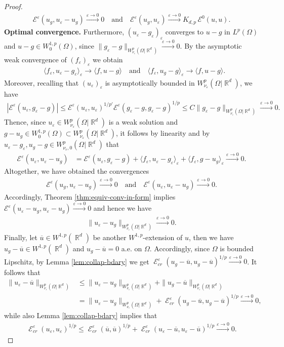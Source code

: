 \documentclass[12pt, reqno]{amsart}%
\theoremstyle{plain}  %
\theoremstyle{definition}  %
\numberwithin{equation}{section}
\DeclareMathOperator{\cE}{\mathcal{E}}
\DeclareMathOperator{\R}{\mathbb{R}}
\newcommand{\eps}{\varepsilon}
\newcommand{\WnuOmRa}{W^p_{\nu_\eps}(\Omega|\R^d )}
\begin{document}
\begin{proof}
\begin{align*}
\mathcal{E}^\eps(u_g,u_\eps-u_g) \xrightarrow{\eps\to0}0
\quad\text{and}\quad
\mathcal{E}^\eps(u_g,u_\eps)
\xrightarrow{\eps\to0}
K_{d,p}\,\mathcal{E}^0(u,u).
\end{align*}
\textbf{Optimal convergence.} Furthermore, $(u_\eps-g_\eps)_\eps$ converges to $u-g$ in $L^p(\Omega)$ and $u-g\in W^{1,p}_0(\Omega)$, since $\|g_\eps-g\|_{\WnuOmRa}\xrightarrow{\eps\to0}0$.
By the asymptotic weak convergence of  $ (f_\eps)_\eps$  we obtain
\begin{align*}
& \langle  f_\eps ,u_\eps-g_\eps \rangle_\eps \to  \langle  f ,u-g \rangle\quad \text{and}\quad
\langle  f_\eps ,u_g-g \rangle_\eps
\to  \langle  f ,u-g \rangle.
\end{align*}
Moreover, recalling that $(u_\eps)_\eps$ is asymptotically bounded in $\WnuOmRa$, we have
\begin{align*}
|\mathcal{E}^\eps(u_\eps,g_\eps-g)|\leq  \mathcal{E}^\eps(u_\eps,u_\eps)^{1/p'}
\mathcal{E}^\eps(g_\eps-g, g_\eps-g)^{1/p}\leq C\|g_\eps-g\|_{\WnuOmRa}\xrightarrow{\eps\to0}0.
\end{align*}
Thence,  since $u_\eps \in \WnuOmRa$ is a weak solution and  $g-u_g\in W^{1,p}_0(\Omega)\subset \WnuOmRa$, it follows by linearity  and by $u_\eps-g_\eps, u_g-g\in W^p_{\nu_\eps,0}(\Omega|\R^d)$ that
\begin{align*}
\mathcal{E}^\eps(u_\eps,u_\eps-u_g)
&= 	\mathcal{E}^\eps(u_\eps,g_\eps-g)
+ \langle  f_\eps ,u_\eps-g_\eps \rangle_\eps
+ \langle  f_\eps ,g-u_g \rangle_\eps
\xrightarrow{\eps\to0}0.
\end{align*}
Altogether,  we have obtained  the convergences
\begin{align*}
\mathcal{E}^\eps(u_g, u_\eps-u_g) \xrightarrow{\eps\to0}0
\quad\text{and}\quad
\mathcal{E}^\eps(u_\eps, u_\eps-u_g) \xrightarrow{\eps\to0}0.
\end{align*}
Accordingly,  Theorem \ref{thm:equiv-conv-in-form} implies $\mathcal{E}^\eps(u_\eps-u_g, u_\eps-u_g) \xrightarrow{\eps\to0}0$ and hence  we have
\begin{align*}
\|u_\eps-u_g\|_{\WnuOmRa} \xrightarrow{\eps\to0}0.
\end{align*}
Finally, let $\overline{u}\in W^{1,p}(\R^d)$ be another $W^{1,p}$-extension of $u$, then we have  $u_g-\overline{u}\in W^{1,p}(\R^d)$  and $u_g-\overline{u}=0$ a.e. on $\Omega$. Accordingly, since $\Omega$ is bounded Lipschitz, by Lemma  \ref{lem:collap-bdary} we get
$\cE^\eps_{cr}(u_g-\overline{u}, u_g-\overline{u})^{1/p}\xrightarrow{\eps\to0}0$. It follows that
\begin{align*}
\|u_\eps-\overline{u}\|_{\WnuOmRa}
&\leq \|u_\eps-u_g\|_{\WnuOmRa}+ \|u_g-\overline{u}\|_{\WnuOmRa}\\
&=\|u_\eps-u_g\|_{\WnuOmRa}+\cE^\eps_{cr}(u_g-\overline{u}, u_g-\overline{u})^{1/p}\xrightarrow{\eps\to0}0,
\end{align*}
while also Lemma  \ref{lem:collap-bdary} implies that
\begin{align*}
\cE^\eps_{cr}(u_\eps, u_\eps)^{1/p}\leq \cE^\eps_{cr}(\overline{u}, \overline{u})^{1/p}+ \cE^\eps_{cr}(u_\eps-\overline{u}, u_\eps-\overline{u})^{1/p}\xrightarrow{\eps\to0}0.
\end{align*}
\end{proof}
\end{document}
